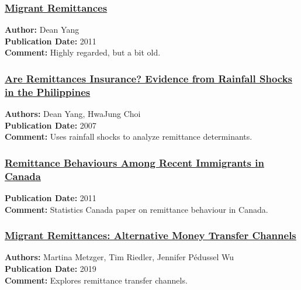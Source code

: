 \documentclass[
  11pt,
]{article}
\begin{document}
\subsubsection{\texorpdfstring{\href{https://drive.google.com/file/d/1e893ibGZcECt9gxIpPgq2XEE2kDGgqx-/view?usp=sharing}{Migrant
Remittances}}{Migrant Remittances}}\label{migrant-remittances}

\textbf{Author:} Dean Yang\\
\textbf{Publication Date:} 2011\\
\textbf{Comment:} Highly regarded, but a bit old.

\subsubsection{\texorpdfstring{\href{https://academic.oup.com/wber/article/21/2/219/1701529}{Are
Remittances Insurance? Evidence from Rainfall Shocks in the
Philippines}}{Are Remittances Insurance? Evidence from Rainfall Shocks in the Philippines}}\label{are-remittances-insurance-evidence-from-rainfall-shocks-in-the-philippines}

\textbf{Authors:} Dean Yang, HwaJung Choi\\
\textbf{Publication Date:} 2007\\
\textbf{Comment:} Uses rainfall shocks to analyze remittance
determinants.

\subsubsection{\texorpdfstring{\href{https://www.statcan.gc.ca/en/catalogue/11-008-X201100211619}{Remittance
Behaviours Among Recent Immigrants in
Canada}}{Remittance Behaviours Among Recent Immigrants in Canada}}\label{remittance-behaviours-among-recent-immigrants-in-canada}

\textbf{Publication Date:} 2011\\
\textbf{Comment:} Statistics Canada paper on remittance behaviour in
Canada.

\subsubsection{\texorpdfstring{\href{https://www.econstor.eu/handle/10419/204586}{Migrant
Remittances: Alternative Money Transfer
Channels}}{Migrant Remittances: Alternative Money Transfer Channels}}\label{migrant-remittances-alternative-money-transfer-channels}

\textbf{Authors:} Martina Metzger, Tim Riedler, Jennifer Pédussel Wu\\
\textbf{Publication Date:} 2019\\
\textbf{Comment:} Explores remittance transfer channels.
\end{document}
